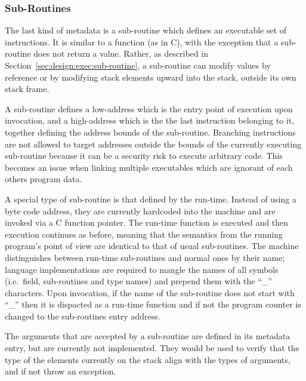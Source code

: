 \subsubsection{Sub-Routines}
\label{sec:implementation:meta:sub-routines}

The last kind of metadata is a sub-routine which defines an executable set of
instructions. It is similar to a function (as in C), with the exception that a
sub-routine does not return a value. Rather, as described in
Section~\ref{sec:design:exec:sub-routine}, a sub-routine can modify values by
reference or by modifying stack elements upward into the stack, outside its own
stack frame.

A sub-routine defines a low-address which is the entry point of execution upon
invocation, and a high-address which is the the last instruction belonging to
it, together defining the address bounds of the sub-routine. Branching
instructions are not allowed to target addresses outside the bounds of the
currently executing sub-routine because it can be a security risk to execute
arbitrary code. This becomes an issue when linking multiple executables which
are ignorant of each others program data.

A special type of sub-routine is that defined by the run-time. Instead of using
a byte code address, they are currently hardcoded into the machine and are
invoked via a C function pointer. The run-time function is executed and then
execution continues as before, meaning that the semantics from the running
program's point of view are identical to that of usual sub-routines. The machine
distinguishes between run-time sub-routines and normal ones by their name;
language implementations are required to mangle the names of all symbols
(i.e.~field, sub-routines and type names) and prepend them with the ``\_''
characters. Upon invocation, if the name of the sub-routine does not start with
``\_'' then it is dispacted as a run-time function and if not the program
counter is changed to the sub-routines entry address.

The arguments that are accepted by a sub-routine are defined in its metadata
entry, but are currently not implemented. They would be used to verify that the
type of the elements currently on the stack align with the types of arguments,
and if not throw an exception.

